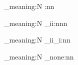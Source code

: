 \documentclass{article}
\begin{document}
\ExplSyntaxOn
\cs_meaning:N \use:nn \par
\cs_meaning:N \use_ii:nnn \par
\cs_meaning:N \use_ii_i:nn \par
\cs_meaning:N \use_none:nn \par
\ExplSyntaxOff
\end{document}
